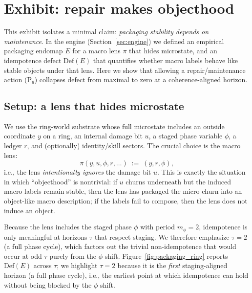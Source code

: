 \documentclass[11pt]{article}
\begin{document}
 \section{Exhibit: repair makes objecthood}
\label{sec:ex_packaging}

This exhibit isolates a minimal claim: \emph{packaging stability depends on maintenance}. In the engine (Section~\ref{sec:engine}) we defined an empirical packaging endomap $E$ for a macro lens $\pi$ that hides microstate, and an idempotence defect $\mathrm{Def}(E)$ that quantifies whether macro labels behave like stable objects under that lens. Here we show that allowing a repair/maintenance action (P$_6$) collapses defect from maximal to zero at a coherence-aligned horizon.

\subsection{Setup: a lens that hides microstate}
We use the ring-world substrate whose full microstate includes an outside coordinate $y$ on a ring, an internal damage bit $u$, a staged phase variable $\phi$, a ledger $r$, and (optionally) identity/skill sectors. The crucial choice is the macro lens:
\[
\pi(y,u,\phi,r,\dots)\;:=\;(y,r,\phi),
\]
i.e., the lens \emph{intentionally ignores} the damage bit $u$. This is exactly the situation in which ``objecthood'' is nontrivial: if $u$ churns underneath but the induced macro labels remain stable, then the lens has packaged the micro-churn into an object-like macro description; if the labels fail to compose, then the lens does not induce an object.

Because the lens includes the staged phase $\phi$ with period $m_{\phi}=2$, idempotence is only meaningful at horizons $\tau$ that respect staging. We therefore emphasize $\tau=2$ (a full phase cycle), which factors out the trivial non-idempotence that would occur at odd $\tau$ purely from the $\phi$ shift. Figure~\ref{fig:packaging_ring} reports $\mathrm{Def}(E)$ across $\tau$; we highlight $\tau=2$ because it is the \emph{first} staging-aligned horizon (a full phase cycle), i.e., the earliest point at which idempotence can hold without being blocked by the $\phi$ shift.
\end{document}
